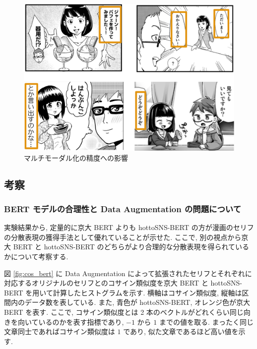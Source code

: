 \begin{figure}[!h]
  \centering
  \includegraphics[width=0.75\hsize]{doc/figures/multimodal_add_seikai.png}
  \caption{マルチモーダル化の精度への影響}
  \label{fig:multimodal_add_seikai}
\end{figure}

\newpage
\changeindent{0cm}
\subsection{考察}
\changeindent{2cm}

\changeindent{0cm}
\subsubsection{BERT モデルの合理性と Data Augmentation の問題について}
\changeindent{2cm}

実験結果から, 定量的に京大 BERT よりも hottoSNS-BERT の方が漫画のセリフの分散表現の獲得手法として優れていることが示せた. ここで, 別の視点から京大 BERT と hottoSNS-BERT のどちらがより合理的な分散表現を得られているかについて考察する.

図 \ref{fig:cos_bert} に Data Augmentation によって拡張されたセリフとそれぞれに対応するオリジナルのセリフとのコサイン類似度を京大 BERT と hottoSNS-BERT を用いて計算したヒストグラムを示す. 横軸はコサイン類似度, 縦軸は区間内のデータ数を表している. また, 青色が hottoSNS-BERT, オレンジ色が京大 BERT を表す. ここで, コサイン類似度とは 2 本のベクトルがどれくらい同じ向きを向いているのかを表す指標であり, $-1$ から $1$ までの値を取る. まったく同じ文章同士であればコサイン類似度は $1$ であり, 似た文章であるほど高い値を示す.

